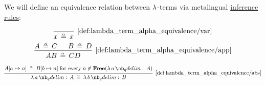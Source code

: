 \begin{definition}\label{def:lambda_term_alpha_equivalence}\mimprovised
  We will define an equivalence relation between \( \mathrm{\lambda} \)-terms via metalingual \hyperref[def:inference_rule]{inference rules}:

  \begin{TwoColumns}
    \begin{equation*}\taglabel[\( \logic{Var}_\alpha \)]{def:lambda_term_alpha_equivalence/var}
      \begin{prooftree}
        \infer0[\ref{def:lambda_term_alpha_equivalence/var}]{ x \aequiv x }
      \end{prooftree}
    \end{equation*}
  \BeginSecondColumn
    \begin{equation*}\taglabel[\( \logic{App}_\alpha \)]{def:lambda_term_alpha_equivalence/app}
      \begin{prooftree}
        \hypo{ A \aequiv C }
        \hypo{ B \aequiv D }
        \infer2[\ref{def:lambda_term_alpha_equivalence/app}]{ AB \aequiv CD }
      \end{prooftree}
    \end{equation*}
  \end{TwoColumns}

  \begin{equation*}\taglabel[\( \logic{Abs}_\alpha \)]{def:lambda_term_alpha_equivalence/abs}
    \begin{prooftree}
      \hypo{ A[a \mapsto n] \aequiv B[b \mapsto n] \T{for every} n \not\in \op*{Free}(\qabs a A) }
      \infer1[\ref{def:lambda_term_alpha_equivalence/abs}]{ \qabs a A \aequiv \qabs b B }
    \end{prooftree}
  \end{equation*}
\end{definition}

